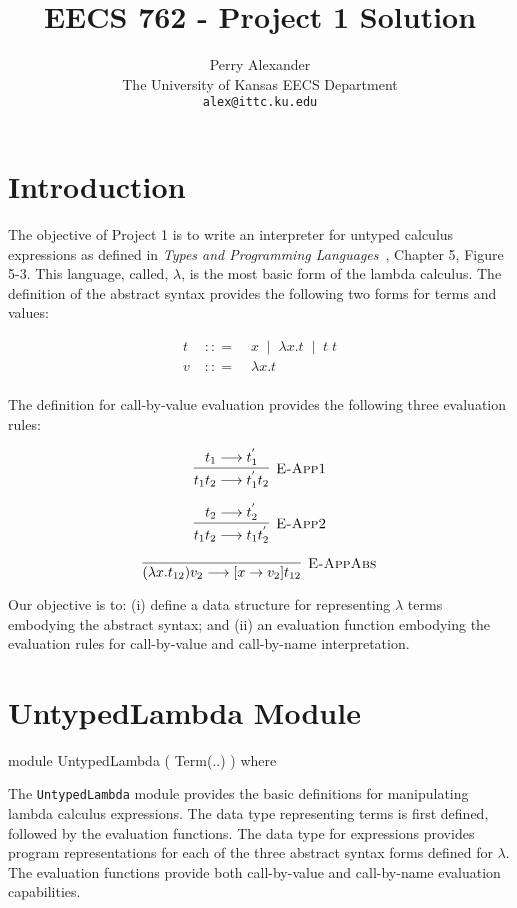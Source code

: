\documentclass[10pt]{article}
\title{EECS 762 - Project 1 Solution}
\author{Perry Alexander \\
  The University of Kansas EECS Department\\
  \texttt{alex@ittc.ku.edu}}
\newcommand{\isa}{\ensuremath{\; {:}{:}{=} \;}}
\newcommand{\ora}{\ensuremath{\;\mid\;}}
\begin{document}
\maketitle

\section{Introduction}

The objective of Project 1 is to write an interpreter for untyped
calculus expressions as defined in \emph{Types and Programming
  Languages}~\cite{Pie02a}, Chapter 5, Figure 5-3.  This language,
called, $\lambda$, is the most basic form of the lambda calculus.  The
definition of the abstract syntax provides the following two forms
for terms and values:

\begin{eqnarray*}
  t & \isa & x \ora \lambda x.t \ora t\; t \\
  v & \isa & \lambda x.t \\
\end{eqnarray*}

The definition for call-by-value evaluation provides the following
three evaluation rules:

\[\vcenter{\infer[\textsc{E-App1}]{t_1 t_2 \longrightarrow t_1^{'} t_2}{t_1\longrightarrow t_1^{'}}}\]

\[\vcenter{\infer[\textsc{E-App2}]{t_1 t_2 \longrightarrow t_1 t_2^{'}}{t_2\longrightarrow t_2^{'}}}\]

\[\vcenter{\infer[\textsc{E-AppAbs}]{(\lambda x.t_{12})v_2 \longrightarrow [x\rightarrow v_2]t_{12}}{}}\]

Our objective is to: (i) define a data structure for representing
$\lambda$ terms embodying the abstract syntax; and (ii) an evaluation
function embodying the evaluation rules for call-by-value and
call-by-name interpretation.

\section{UntypedLambda Module}

\begin{code}
  module UntypedLambda ( Term(..) )
      where
\end{code}

The \texttt{UntypedLambda} module provides the basic definitions for
manipulating lambda calculus expressions.  The data type representing
terms is first defined, followed by the evaluation functions.  The data
type for expressions provides program representations for each of the
three abstract syntax forms defined for $\lambda$.  The evaluation
functions provide both call-by-value and call-by-name evaluation
capabilities.
\end{document}
